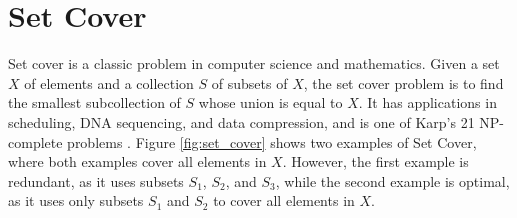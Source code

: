     \section{Set Cover} \label{WSC}
    
        Set cover is a classic problem in computer science and mathematics. Given a set $X$ of elements and a collection $S$ of subsets of $X$, the set cover problem is to find the smallest subcollection of $S$ whose union is equal to $X$\cite{cormen, bondy1976graph}. It has applications in scheduling, DNA sequencing, and data compression, and is one of Karp's 21 NP-complete problems \cite{karp1972reducibility}. 
        Figure \ref{fig:set_cover} shows two examples of Set Cover, where both examples cover all elements in $X$. However, the first example is redundant, as it uses subsets $S_1$, $S_2$, and $S_3$, while the second example is optimal, as it uses only subsets $S_1$ and $S_2$ to cover all elements in $X$.

